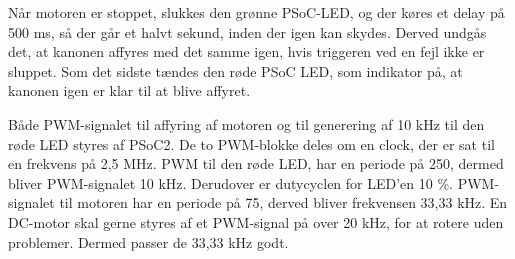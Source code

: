 Når motoren er stoppet, slukkes den grønne PSoC-LED, og der køres et delay på 500 ms, så der går et halvt sekund, inden der igen kan skydes. Derved undgås det, at kanonen affyres med det samme igen, hvis triggeren ved en fejl ikke er sluppet. Som det sidste tændes den røde PSoC LED, som indikator på, at kanonen igen er klar til at blive affyret. 

Både PWM-signalet til affyring af motoren og til generering af 10 kHz til den røde LED styres af PSoC2. De to PWM-blokke deles om en clock, der er sat til en frekvens på 2,5 MHz. PWM til den røde LED, har en periode på 250, dermed bliver PWM-signalet 10 kHz. Derudover er dutycyclen for LED'en 10 \%. PWM-signalet til motoren har en periode på 75, derved bliver frekvensen 33,33 kHz. En DC-motor skal gerne styres af et PWM-signal på over 20 kHz, for at rotere uden problemer. Dermed passer de 33,33 kHz godt. 
